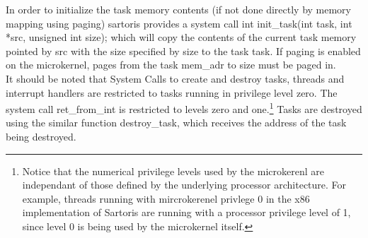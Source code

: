 \documentclass[11pt, letterpaper, twoside, english]{book}
\begin{document}
In order to initialize the task memory contents (if not done directly by memory mapping using paging) sartoris provides a system call \textsf{int init\_task(int task, int *src, unsigned int size);} which will copy the contents of the current task memory pointed by \textsf{src} with the size specified by \textsf{size} to the task \textsf{task}. If paging is enabled on the microkernel, pages from the task \textsf{mem\_adr} to \textsf{size} must be paged in.\\

It should be noted that System Calls to create and destroy tasks, threads and interrupt handlers are restricted to tasks running in privilege level zero. The system call \textsf{ret\_from\_int} is restricted to levels zero and one.\footnote{Notice that the numerical privilege levels used by the microkerenl are independant of those defined by the underlying processor architecture. For example, threads running with mircrokerenel privlege 0 in the x86 implementation of Sartoris are running with a processor privilege level of 1, since level 0 is being used by the microkernel itself.}
Tasks are destroyed using the similar function \textsf{destroy\_task}, which receives the address of the task being destroyed.\\
\end{document}
